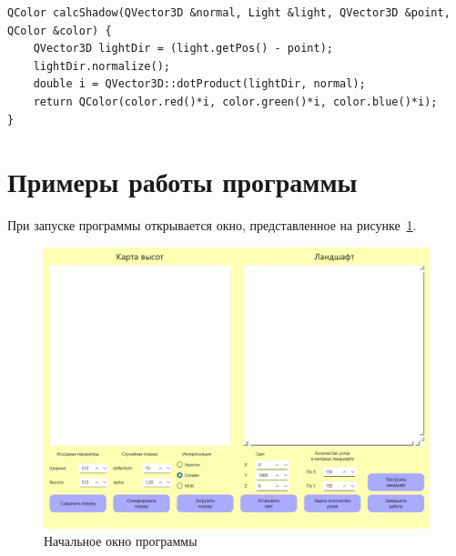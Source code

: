 \documentclass[a4paper, 14pt]{extreport}
\begin{document}
\begin{lstlisting}[style=lang, label=lst:shadow,caption=Реализация функции calcShadow]
QColor calcShadow(QVector3D &normal, Light &light, QVector3D &point, QColor &color) {
    QVector3D lightDir = (light.getPos() - point);
    lightDir.normalize();
    double i = QVector3D::dotProduct(lightDir, normal);
    return QColor(color.red()*i, color.green()*i, color.blue()*i);
}
\end{lstlisting}

\section{Примеры работы программы}

При запуске программы открывается окно, представленное на рисунке~\ref{pict:ex1}.
\begin{figure}[h]
	\centering
	\includegraphics[scale=0.55]{tools/ex1.png}
	\caption{Начальное окно программы}
	\label{pict:ex1}
\end{figure}
\end{document}

